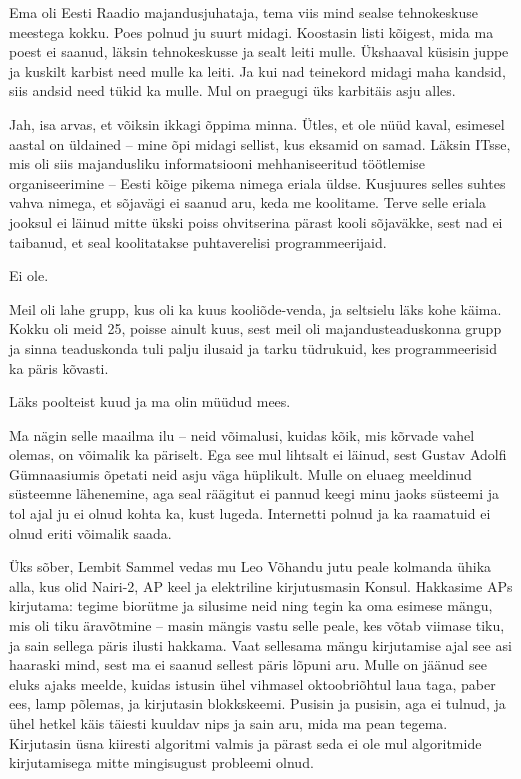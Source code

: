 
Ema oli Eesti Raadio 
majandusjuhataja, tema viis mind sealse tehnokeskuse meestega kokku. Poes 
polnud ju suurt midagi. Koostasin listi kõigest, mida ma poest ei saanud, 
läksin tehnokeskusse ja sealt leiti mulle. Ükshaaval küsisin juppe ja kuskilt 
karbist need mulle ka leiti. Ja kui nad teinekord midagi maha kandsid, siis 
andsid need tükid ka mulle. Mul on praegugi üks karbitäis asju alles.


Jah, isa arvas, et võiksin ikkagi õppima minna. Ütles, et ole nüüd kaval, esimesel 
aastal on üldained -- mine õpi midagi sellist, kus eksamid on samad. 
Läksin ITsse, mis oli siis majandusliku informatsiooni 
mehhaniseeritud töötlemise organiseerimine -- Eesti kõige pikema nimega eriala 
üldse. Kusjuures selles suhtes vahva nimega, et sõjavägi ei saanud 
aru, keda me koolitame. Terve selle eriala jooksul ei läinud mitte ükski poiss 
ohvitserina pärast kooli sõjaväkke, sest nad ei taibanud, et seal koolitatakse
puhtaverelisi programmeerijaid.


Ei ole. 

Meil oli lahe grupp, kus oli ka kuus kooliõde-venda, ja seltsielu läks kohe käima. Kokku oli meid 25, poisse ainult kuus, sest meil oli 
majandusteaduskonna grupp ja sinna teaduskonda tuli palju ilusaid ja tarku tüdrukuid, kes programmeerisid ka päris kõvasti. 

Läks poolteist kuud ja ma olin müüdud mees.


Ma nägin selle maailma ilu -- neid võimalusi, 
kuidas kõik, mis kõrvade vahel olemas, on võimalik ka päriselt. Ega see 
mul lihtsalt ei läinud, sest Gustav Adolfi Gümnaasiumis õpetati 
neid asju väga hüplikult. Mulle on eluaeg meeldinud süsteemne lähenemine, 
aga seal räägitut ei pannud keegi minu jaoks süsteemi ja 
tol ajal ju ei olnud kohta ka, kust lugeda. Internetti polnud ja ka
raamatuid ei olnud eriti võimalik saada. 

Üks sõber, Lembit Sammel vedas mu Leo 
Võhandu jutu peale kolmanda ühika alla, kus olid Nairi-2, AP keel ja 
elektriline kirjutusmasin Konsul. Hakkasime APs kirjutama: tegime biorütme ja 
silusime neid ning tegin ka oma esimese mängu, mis oli tiku äravõtmine -- masin mängis vastu selle peale, kes võtab 
viimase tiku, ja sain sellega päris ilusti hakkama. Vaat 
sellesama mängu kirjutamise ajal see asi haaraski mind, sest ma ei 
saanud sellest päris lõpuni aru. Mulle on jäänud see eluks ajaks meelde, kuidas istusin ühel vihmasel oktoobriõhtul laua 
taga, paber ees, lamp põlemas, ja kirjutasin blokkskeemi. 
Pusisin ja pusisin, aga ei tulnud, ja ühel hetkel käis täiesti kuuldav nips ja sain 
aru, mida ma pean tegema. Kirjutasin üsna kiiresti algoritmi valmis ja 
pärast seda ei ole mul algoritmide kirjutamisega mitte mingisugust probleemi 
olnud. 

